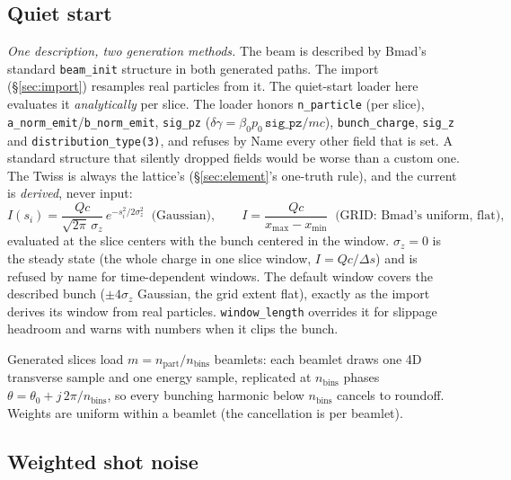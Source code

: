 \documentclass[11pt]{article}
\newcommand{\code}[1]{\texttt{#1}}
\begin{document}
\subsection{Quiet start}\label{sec:quiet}

\emph{One description, two generation methods.} The beam is described by Bmad's
standard \code{beam\_init} structure in both generated paths. The import
(\S\ref{sec:import}) resamples real particles from it. The quiet-start loader here
evaluates it \emph{analytically} per slice. The loader honors
\code{n\_particle} (per slice), \code{a\_norm\_emit}/\code{b\_norm\_emit},
\code{sig\_pz} ($\delta\gamma = \beta_0 p_0 \,\code{sig\_pz}/mc$),
\code{bunch\_charge}, \code{sig\_z} and \code{distribution\_type(3)}, and refuses by
Name every other field that is set. A standard structure that silently dropped
fields would be worse than a custom one. The Twiss is always the lattice's
(\S\ref{sec:element}'s one-truth rule), and the current is \emph{derived}, never
input:
\begin{equation}\label{eq:derivedcurrent}
  I(s_i) = \frac{Q c}{\sqrt{2\pi}\,\sigma_z}\, e^{-s_i^2/2\sigma_z^2}
  \;\;\text{(Gaussian)}, \qquad
  I = \frac{Q c}{x_{\max}-x_{\min}} \;\;\text{(GRID: Bmad's uniform, flat)},
\end{equation}
evaluated at the slice centers with the bunch centered in the window. $\sigma_z = 0$
is the steady state (the whole charge in one slice window, $I = Qc/\Delta s$)
and is refused by name for time-dependent windows. The default window covers the
described bunch ($\pm4\sigma_z$ Gaussian, the grid extent flat), exactly as the
import derives its window from real particles. \code{window\_length} overrides it
for slippage headroom and warns with numbers when it clips the bunch.

Generated slices load $m = n_{\mathrm{part}}/n_{\mathrm{bins}}$ beamlets: each beamlet
draws one 4D transverse sample and one energy sample, replicated at $n_{\mathrm{bins}}$
phases $\theta = \theta_0 + j\,2\pi/n_{\mathrm{bins}}$, so every bunching harmonic
below $n_{\mathrm{bins}}$ cancels to roundoff. Weights are uniform within a beamlet
(the cancellation is per beamlet).

\subsection{Weighted shot noise}\label{sec:noise}
\end{document}
